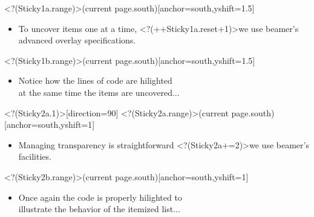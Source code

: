 \Sticky<?(Sticky1a.range)>(current page.south)[anchor=south,yshift=1.5\baselineskip]{\bfseries%
\begin{minipage}{0.75\textwidth}
\vspace{-0.5\baselineskip}%
\begin{itemize}
\item[\myBulb]To uncover items one at a time,
\visible<?(++Sticky1a.reset+1)>{we use beamer's%
advanced overlay specifications.
}
\end{itemize}
\end{minipage}
}%
\Sticky<?(Sticky1b.range)>(current page.south)[anchor=south,yshift=1.5\baselineskip]{\bfseries%
\begin{minipage}{0.7\textwidth}
\vspace{-0.5\baselineskip}%
\begin{itemize}
\item[\myBulb]Notice how the lines of code are hilighted\\at the same time the items are uncovered...
\end{itemize}
\end{minipage}
}%
\transpush<?(Sticky2a.1)>[direction=90]
\Sticky<?(Sticky2a.range)>(current page.south)[anchor=south,yshift=1\baselineskip]{\bfseries\begin{minipage}{0.7\textwidth}%
\vspace{-0.5\baselineskip}%
\begin{itemize}
\item[\myBulb]Managing transparency is straightforward
\visible<?(Sticky2a+=2)>{we use%
beamer's facilities.%
}%
\end{itemize}
\end{minipage}}%
\Sticky<?(Sticky2b.range)>(current page.south)[anchor=south,yshift=1\baselineskip]{\bfseries\begin{minipage}{0.7\textwidth}%
\begin{itemize}
\item[\myBulb]Once again the code is properly hilighted to\\illustrate the behavior of the itemized list...
\end{itemize}
\end{minipage}
}%
%
